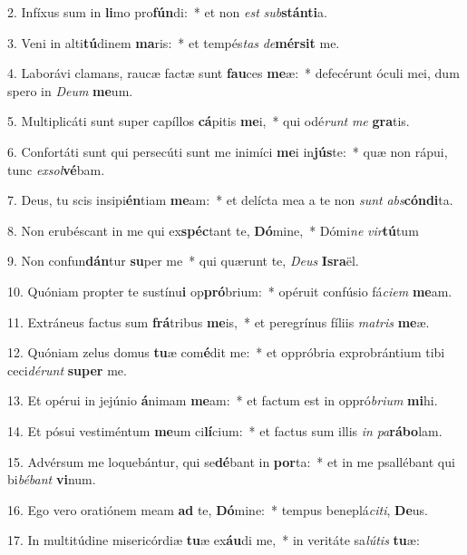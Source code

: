 2. Infíxus sum in \textbf{li}mo pro\textbf{fún}di:~*  et non \textit{est} \textit{sub}\textbf{stán}\textbf{ti}a.\

3. Veni in alti\textbf{tú}dinem \textbf{ma}ris:~*  et tempés\textit{tas} \textit{de}\textbf{mér}\textbf{sit} me.\

4. Laborávi clamans, raucæ factæ sunt \textbf{fau}ces \textbf{me}æ:~*  defecérunt óculi mei, dum spero in \textit{De}\textit{um} \textbf{me}um.\

5. Multiplicáti sunt super capíllos \textbf{cá}pitis \textbf{me}i,~*  qui odé\textit{runt} \textit{me} \textbf{gra}tis.\

6. Confortáti sunt qui persecúti sunt me inimíci \textbf{me}i in\textbf{jús}te:~*  quæ non rápui, tunc \textit{ex}\textit{sol}\textbf{vé}bam.\

7. Deus, tu scis insipi\textbf{én}tiam \textbf{me}am:~*  et delícta mea a te non \textit{sunt} \textit{abs}\textbf{cón}\textbf{di}ta.\

8. Non erubéscant in me qui ex\textbf{spéc}tant te, \textbf{Dó}mine,~*  Dómi\textit{ne} \textit{vir}\textbf{tú}tum\

9. Non confun\textbf{dán}tur \textbf{su}per me~*  qui quærunt te, \textit{De}\textit{us} \textbf{Is}\textbf{ra}ël.\

10. Quóniam propter te sustínu\textbf{i} op\textbf{pró}brium:~*  opéruit confúsio fá\textit{ci}\textit{em} \textbf{me}am.\

11. Extráneus factus sum \textbf{frá}tribus \textbf{me}is,~*  et peregrínus fíliis \textit{ma}\textit{tris} \textbf{me}æ.\

12. Quóniam zelus domus \textbf{tu}æ com\textbf{é}dit me:~*  et oppróbria exprobrántium tibi ceci\textit{dé}\textit{runt} \textbf{su}\textbf{per} me.\

13. Et opérui in jejúnio \textbf{á}nimam \textbf{me}am:~*  et factum est in oppró\textit{bri}\textit{um} \textbf{mi}hi.\

14. Et pósui vestiméntum \textbf{me}um ci\textbf{lí}cium:~*  et factus sum illis \textit{in} \textit{pa}\textbf{rá}\textbf{bo}lam.\

15. Advérsum me loquebántur, qui se\textbf{dé}bant in \textbf{por}ta:~*  et in me psallébant qui bi\textit{bé}\textit{bant} \textbf{vi}num.\

16. Ego vero oratiónem meam \textbf{ad} te, \textbf{Dó}mine:~*  tempus beneplá\textit{ci}\textit{ti}, \textbf{De}us.\

17. In multitúdine misericórdiæ \textbf{tu}æ ex\textbf{áu}di me,~*  in veritáte sa\textit{lú}\textit{tis} \textbf{tu}æ:\


